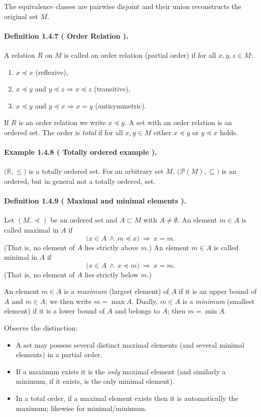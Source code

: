 \documentclass[12pt,a4paper]{article}
\newcommand{\R}{\mathbb{R}}
\newcommand{\NumberedDefinition}[3]{%
	\paragraph{Definition #1 ( #2 ).} #3\par
}
\newcommand{\NumberedExample}[3]{%
	\paragraph{Example #1 ( #2 ).} #3\par
}
\theoremstyle{plain}
\theoremstyle{definition}
\theoremstyle{remark}
\begin{document}
The equivalence classes are pairwise disjoint and their union reconstructs the original set $M$.

\medskip
\NumberedDefinition{1.4.7}{Order Relation}{A relation $R$ on $M$ is called an order relation (partial order) if for all $x,y,z\in M$:
\begin{enumerate}[label=\roman*)]
	\item $x\preceq x$ (reflexive),
	\item $x\preceq y$ and $y\preceq z \Rightarrow x\preceq z$ (transitive),
	\item $x\preceq y$ and $y\preceq x \Rightarrow x=y$ (antisymmetric).
\end{enumerate}
If $R$ is an order relation we write $x\preceq y$. A set with an order relation is an ordered set. The order is \emph{total} if for all $x,y\in M$ either $x\preceq y$ or $y\preceq x$ holds.
}

\NumberedExample{1.4.8}{Totally ordered example}{\(\big(\R,\le\big)\) is a totally ordered set. For an arbitrary set \(M\), \(\big(\mathcal P(M),\subseteq\big)\) is an ordered, but in general not a totally ordered, set.}
\NumberedDefinition{1.4.9}{Maximal and minimal elements}{Let \((M,\preceq)\) be an ordered set and \(A\subset M\) with \(A\neq\emptyset\). An element \(m\in A\) is called maximal in \(A\) if
\[
\bigl(x\in A \ \wedge\ m\preceq x\bigr)\ \Longrightarrow\ x = m.
\]
(That is, no element of \(A\) lies strictly above \(m\).)
An element \(m\in A\) is called minimal in \(A\) if
\[
\bigl(x\in A \ \wedge\ x\preceq m\bigr)\ \Longrightarrow\ x = m.
\]
(That is, no element of \(A\) lies strictly below \(m\).)
\label{def:1.4.9}}

An element \(m\in A\) is a \emph{maximum} (largest element) of \(A\) if it is an upper bound of \(A\) and \(m\in A\); we then write \(m=\max A\). Dually, \(m\in A\) is a \emph{minimum} (smallest element) if it is a lower bound of \(A\) and belongs to \(A\); then \(m=\min A\).

Observe the distinction:
\begin{itemize}[leftmargin=*]
	\item A set may possess several distinct maximal elements (and several minimal elements) in a partial order.
	\item If a maximum exists it is the \emph{only} maximal element (and similarly a minimum, if it exists, is the only minimal element).
	\item In a total order, if a maximal element exists then it is automatically the maximum; likewise for minimal/minimum.
\end{itemize}
\end{document}
